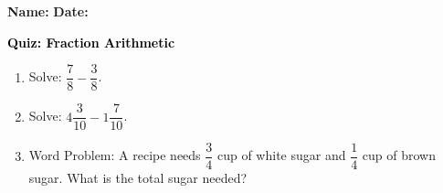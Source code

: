 \documentclass[12pt, letterpaper, fleqn]{article}
\begin{document}
\textbf{Name:} \underline{\hspace{5cm}}
\hfill
\textbf{Date:} \underline{\hspace{3cm}}\\

\begin{tcolorbox}[colback=customteal!20]
    \large\textcolor{black}{\textbf{Quiz: Fraction Arithmetic}}
\end{tcolorbox}
\begin{enumerate}[itemsep=3.5cm, leftmargin=0.6cm]
\item Solve: $\dfrac{7}{8} - \dfrac{3}{8}$.
\vspace{3.5cm}
\item Solve: $4\dfrac{3}{10} - 1\dfrac{7}{10}$.
\vspace{3.5cm}
\item Word Problem: A recipe needs $\dfrac{3}{4}$ cup of white sugar and $\dfrac{1}{4}$ cup of brown sugar. What is the total sugar needed?
\end{enumerate}
\end{document}
